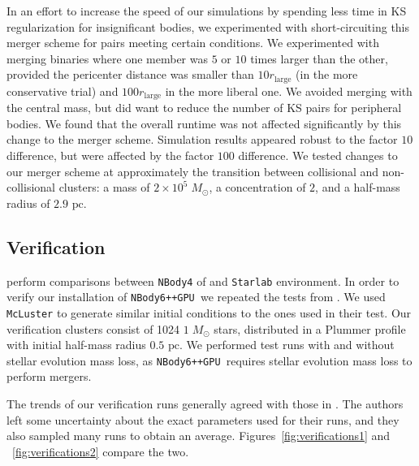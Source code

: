 \documentclass[preprint1]{aastex}
\newcommand\Msun{\; M_\odot}
\newcommand\pc{\mbox{ pc}}
\newcommand\nbody{\texttt{NBody6++GPU }}
\numberwithin{equation}{section}
\begin{document}
In an effort to increase the speed of our simulations by spending less time in KS regularization for insignificant bodies, we experimented with short-circuiting this merger scheme for pairs meeting certain conditions.  We experimented with merging binaries where one member was $5$ or $10$ times larger than the other, provided the pericenter distance was smaller than $10 r_\mathrm{large}$ (in the more conservative trial) and $100 r_\mathrm{large}$ in the more liberal one.  We avoided merging with the central mass, but did want to reduce the number of KS pairs for peripheral bodies. We found that the overall runtime was not affected significantly by this change to the merger scheme. Simulation results appeared robust to the factor $10$ difference, but were affected by the factor $100$ difference.  We tested changes to our merger scheme at approximately the transition between collisional and non-collisional clusters: a mass of $2 \times 10^5 \Msun$, a concentration of $2$, and a half-mass radius of $2.9 \pc$.

\subsection{Verification}
\citet{2009Anders, 2012Anders} perform comparisons between \texttt{NBody4} of \citet{1999Aarseth} and \texttt{Starlab} environment.  In order to verify our installation of \nbody we repeated the tests from \citet{2009Anders}.  We used \texttt{McLuster} to generate similar initial conditions to the ones used in their test. Our verification clusters consist of 1024 $1 \Msun$ stars, distributed in a Plummer profile with initial half-mass radius $0.5 \pc$.  We performed test runs with and without stellar evolution mass loss, as \nbody requires stellar evolution mass loss to perform mergers.

The trends of our verification runs generally agreed with those in \citet{2009Anders}.  The authors left some uncertainty about the exact parameters used for their runs, and they also sampled many runs to obtain an average. Figures~\ref{fig:verifications1} and ~\ref{fig:verifications2} compare the two.
\end{document}
